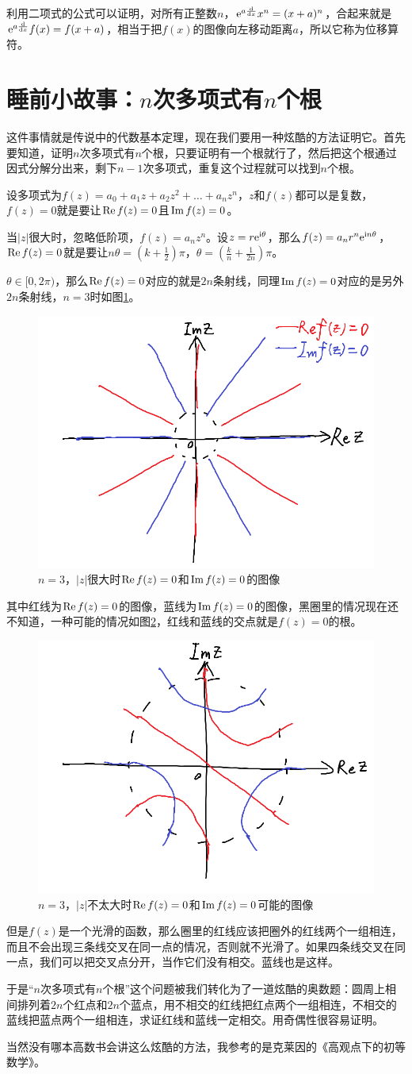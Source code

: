 利用二项式的公式可以证明，对所有正整数$n$，$\mathrm{e}^{a \frac{\mathop{}\!\mathrm{d}}{\mathop{}\!\mathrm{d} x}} x^n=(x+a)^n$，合起来就是$\mathrm{e}^{a \frac{\mathop{}\!\mathrm{d}}{\mathop{}\!\mathrm{d} x}} f(x)=f(x+a)$，相当于把$f(x)$的图像向左移动距离$a$，所以它称为位移算符。
\section{睡前小故事：$n$次多项式有$n$个根}
这件事情就是传说中的代数基本定理，现在我们要用一种炫酷的方法证明它。首先要知道，证明$n$次多项式有$n$个根，只要证明有一个根就行了，然后把这个根通过因式分解分出来，剩下$n-1$次多项式，重复这个过程就可以找到$n$个根。

设多项式为$f(z)=a_0 +a_1 z+a_2 z^2+\dots+a_n z^n$，$z$和$f(z)$都可以是复数，$f(z)=0$就是要让$\mathrm{Re}\mathop{}\! f(z)=0$且$\mathrm{Im}\mathop{}\! f(z)=0$。

当$|z|$很大时，忽略低阶项，$f(z)=a_n z^n$。设$z=r \mathrm{e}^{\mathrm{i} \theta}$，那么$f(z)=a_n r^n \mathrm{e}^{\mathrm{i} n \theta}$，$\mathrm{Re}\mathop{}\! f(z)=0$就是要让$n \theta=(k+\frac{1}{2})\pi$，$\theta=(\frac{k}{n}+\frac{1}{2n})\pi$。

$\theta \in [0,2\pi)$，那么$\mathrm{Re}\mathop{}\! f(z)=0$对应的就是$2n$条射线，同理$\mathrm{Im}\mathop{}\! f(z)=0$对应的是另外$2n$条射线，$n=3$时如图\ref{fig-poly-root-outer}。
\begin{figure}[htb]
\centering
\includegraphics[width=0.33\linewidth]{fig/poly-root-outer.png}
\caption{$n=3$，$|z|$很大时$\mathrm{Re}\mathop{}\! f(z)=0$和$\mathrm{Im}\mathop{}\! f(z)=0$的图像}
\label{fig-poly-root-outer}
\end{figure}

其中红线为$\mathrm{Re}\mathop{}\! f(z)=0$的图像，蓝线为$\mathrm{Im}\mathop{}\! f(z)=0$的图像，黑圈里的情况现在还不知道，一种可能的情况如图\ref{fig-poly-root-inner}，红线和蓝线的交点就是$f(z)=0$的根。
\begin{figure}[htb]
\centering
\includegraphics[width=0.33\linewidth]{fig/poly-root-inner.png}
\caption{$n=3$，$|z|$不太大时$\mathrm{Re}\mathop{}\! f(z)=0$和$\mathrm{Im}\mathop{}\! f(z)=0$可能的图像}
\label{fig-poly-root-inner}
\end{figure}

但是$f(z)$是一个光滑的函数，那么圈里的红线应该把圈外的红线两个一组相连，而且不会出现三条线交叉在同一点的情况，否则就不光滑了。如果四条线交叉在同一点，我们可以把交叉点分开，当作它们没有相交。蓝线也是这样。

于是“$n$次多项式有$n$个根”这个问题被我们转化为了一道炫酷的奥数题：圆周上相间排列着$2n$个红点和$2n$个蓝点，用不相交的红线把红点两个一组相连，不相交的蓝线把蓝点两个一组相连，求证红线和蓝线一定相交。用奇偶性很容易证明。

当然没有哪本高数书会讲这么炫酷的方法，我参考的是克莱因的《高观点下的初等数学》。
